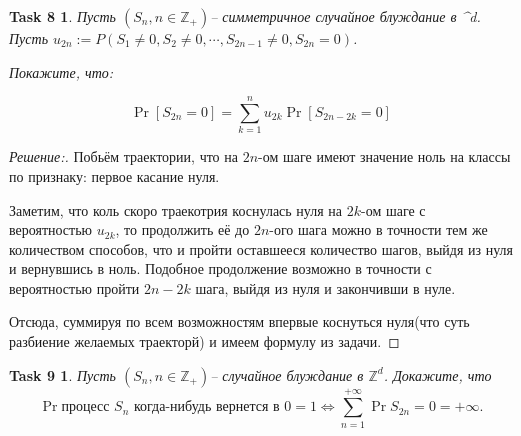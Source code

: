\documentclass{article}
\newtheorem*{task8}{Task 8}
\newtheorem*{task9}{Task 9}
\newcommand{\Z}{\mathbb{Z}}
\begin{document}
        
        
        \vspace{\baselineskip}
        
        \begin{task8}
            Пусть $(S_n, n\in \Z_+)$-- симметричное случайное блуждание в ^d. Пусть $u_{2n} := P(S_1 \neq 0, S_2 \neq 0, \cdots , S_{2n-1} \neq 0, S_{2n} = 0)$.
            
            Покажите, что:
            
            \[
            \Pr[S_{2n} = 0] = \sum_{k=1}^{n} u_{2k} \Pr[S_{2n - 2k} = 0] 
            \]
        \end{task8}
        
        
        \begin{proof}[Решение:]
        Побьём траектории, что на $2n$-ом шаге имеют значение ноль на классы по признаку: первое касание нуля.
        
        Заметим, что коль скоро траекотрия коснулась нуля на $2k$-ом шаге с вероятностью $u_{2k}$, то продолжить её до $2n$-ого шага можно в точности тем же количеством способов, что и пройти оставшееся количество шагов, выйдя из нуля и вернувшись в ноль. Подобное продолжение возможно в точности с вероятностью пройти $2n-2k$ шага, выйдя из нуля и закончивши в нуле. 
        
        Отсюда, суммируя по всем возможностям впервые коснуться нуля(что суть разбиение желаемых траекторй) и имеем формулу из задачи. 
        \end{proof}
        
        
        
        
        
        
        
        
        
        
    
        
        
        
        
                \begin{task9}
                  Пусть $(S_n, n\in \Z_+)$-- случайное блуждание в $\Z ^d$. Докажите, что 
      \[
      \Pr {\text{процесс $S_n$ когда-нибудь вернется в $0$}} = 1
      \Leftrightarrow
      \sum_{n=1}^{+\infty} \Pr{S_{2n} = 0} = +\infty.
            \]
        \end{task9}
        
        
\end{document}
